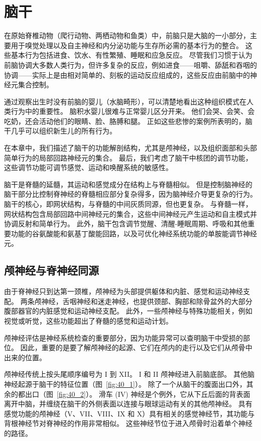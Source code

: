 \chapter{脑干} \label{chap:chap40}

在原始脊椎动物（爬行动物、两栖动物和鱼类）中，前脑只是大脑的一小部分，主要用于嗅觉处理以及自主神经和内分泌功能与生存所必需的基本行为的整合。
这些基本行为包括进食、饮水、有性繁殖、睡眠和应急反应。
尽管我们习惯于认为前脑协调大多数人类行为，但许多复杂的反应，例如进食——咀嚼、舔舐和吞咽的协调——实际上是由相对简单的、刻板的运动反应组成的，这些反应由前脑中的神经元集合控制。


通过观察出生时没有前脑的婴儿（水脑畸形），可以清楚地看出这种组织模式在人类行为中的重要性。
脑积水婴儿很难与正常婴儿区分开来。 他们会哭、会笑、会吃奶，还会活动他们的眼睛、脸、胳膊和腿。
正如这些悲惨的案例所表明的，脑干几乎可以组织新生儿的所有行为。


在本章中，我们描述了脑干的功能解剖结构，尤其是颅神经，以及组织面部和头部简单行为的局部回路神经元的集合。
最后，我们考虑了脑干中核团的调节功能，这些调节功能可调节感觉、运动和唤醒系统的敏感性。


脑干是脊髓的延髓，其运动和感觉成分在结构上与脊髓相似。
但是控制脑神经的脑干部分比控制脊神经的脊髓相应部分复杂得多，因为脑神经介导更复杂的行为。
脑干的核心，即网状结构，与脊髓的中间灰质同源，但也更复杂。
与脊髓一样，网状结构包含局部回路中间神经元的集合，这些中间神经元产生运动和自主模式并协调反射和简单行为。
此外，脑干包含调节觉醒、清醒-睡眠周期、呼吸和其他重要功能的谷氨酸能和氨基丁酸能回路，以及可优化神经系统功能的单胺能调节神经元。



\section{颅神经与脊神经同源}

由于脊神经只到达第一颈椎，颅神经为头部提供躯体和内脏、感觉和运动神经支配。
两条颅神经，舌咽神经和迷走神经，也提供颈部、胸部和除骨盆外的大部分腹部器官的内脏感觉和运动神经支配。
此外，一些颅神经与特殊功能相关，例如视觉或听觉，这些功能超出了脊髓的感觉和运动计划。


颅神经评估是神经系统检查的重要部分，因为功能异常可以查明脑干中受损的部位。
因此，重要的是要了解颅神经的起源、它们在颅内的走行以及它们从颅骨中出来的位置。


颅神经传统上按头尾顺序编号为 I 到 XII。
I 和 II 颅神经进入前脑底部。
其他脑神经起源于脑干的特征位置（图~\ref{fig:40_1}）。
除了一个从脑干的腹面出口外，其余的都出口（图~\ref{fig:40_2}）。
滑车 (IV) 神经是个例外，它从下丘后面的背表面离开中脑，并缠绕在脑干的外侧表面以连接与眼球运动有关的其他颅神经。
具有感觉功能的颅神经（V、VII、VIII、IX 和 X）具有相关的感觉神经节，其功能与背根神经节对脊神经的作用非常相似。
这些神经节位于进入颅骨时沿着单个神经的路径。


